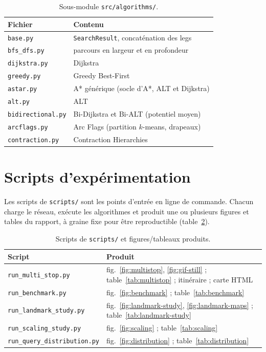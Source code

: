 \begin{table}[H]
  \centering
  \small
  \begin{tabular}{@{}ll@{}}
    \toprule
    Fichier & Contenu \\
    \midrule
    \texttt{base.py}          & \texttt{SearchResult}, concaténation des legs \\
    \texttt{bfs\_dfs.py}      & parcours en largeur et en profondeur \\
    \texttt{dijkstra.py}      & Dijkstra \\
    \texttt{greedy.py}        & Greedy Best-First \\
    \texttt{astar.py}         & A* générique (socle d'A*, ALT et Dijkstra) \\
    \texttt{alt.py}           & ALT \\
    \texttt{bidirectional.py} & Bi-Dijkstra et Bi-ALT (potentiel moyen) \\
    \texttt{arcflags.py}      & Arc Flags (partition $k$-means, drapeaux) \\
    \texttt{contraction.py}   & Contraction Hierarchies \\
    \bottomrule
  \end{tabular}
  \caption{Sous-module \texttt{src/algorithms/}.}
  \label{tab:algos-files}
\end{table}

\section{Scripts d'expérimentation}

Les scripts de \texttt{scripts/} sont les points d'entrée en ligne de commande.
Chacun charge le réseau, exécute les algorithmes et produit une ou plusieurs
figures et tables du rapport, à graine fixe pour être reproductible
(table~\ref{tab:scripts}).

\begin{table}[H]
  \centering
  \small
  \begin{tabular}{@{}ll@{}}
    \toprule
    Script & Produit \\
    \midrule
    \texttt{run\_multi\_stop.py}         & fig.~\ref{fig:multistop}, \ref{fig:gif-still} ; table~\ref{tab:multistop} ; itinéraire ; carte HTML \\
    \texttt{run\_benchmark.py}           & fig.~\ref{fig:benchmark} ; table~\ref{tab:benchmark} \\
    \texttt{run\_landmark\_study.py}     & fig.~\ref{fig:landmark-study}, \ref{fig:landmark-maps} ; table~\ref{tab:landmark-study} \\
    \texttt{run\_scaling\_study.py}      & fig.~\ref{fig:scaling} ; table~\ref{tab:scaling} \\
    \texttt{run\_query\_distribution.py} & fig.~\ref{fig:distribution} ; table~\ref{tab:distribution} \\
    \bottomrule
  \end{tabular}
  \caption{Scripts de \texttt{scripts/} et figures/tableaux produits.}
  \label{tab:scripts}
\end{table}

